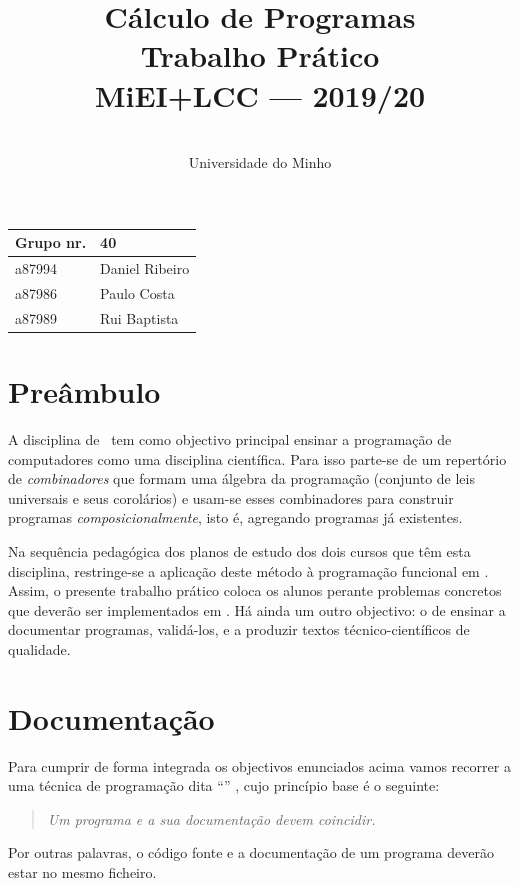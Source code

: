 \documentclass[a4paper]{article}
\title{
            Cálculo de Programas
\\
        Trabalho Prático
\\
        MiEI+LCC --- 2019/20
}
\author{
        \dium
\\
        Universidade do Minho
}
\date\mydate
\begin{document}
\maketitle

\begin{center}\large
\begin{tabular}{ll}
\textbf{Grupo} nr. & 40 
\\\hline
a87994 & Daniel Ribeiro 
\\
a87986 & Paulo Costa  
\\
a87989 & Rui Baptista
\end{tabular}
\end{center}

\section{Preâmbulo}

A disciplina de \CP\ tem como objectivo principal ensinar
a progra\-mação de computadores como uma disciplina científica. Para isso
parte-se de um repertório de \emph{combinadores} que formam uma álgebra da
programação (conjunto de leis universais e seus corolários) e usam-se esses
combinadores para construir programas \emph{composicionalmente}, isto é,
agregando programas já existentes.
  
Na sequência pedagógica dos planos de estudo dos dois cursos que têm
esta disciplina, restringe-se a aplicação deste método à programação
funcional em \Haskell. Assim, o presente trabalho prático coloca os
alunos perante problemas concretos que deverão ser implementados em
\Haskell.  Há ainda um outro objectivo: o de ensinar a documentar
programas, validá-los, e a produzir textos técnico-científicos de
qualidade.

\section{Documentação} Para cumprir de forma integrada os objectivos
enunciados acima vamos recorrer a uma técnica de programa\-ção dita
``'' \cite{Kn92}, cujo princípio base é o seguinte:
\begin{quote}\em Um programa e a sua documentação devem coincidir.
\end{quote} Por outras palavras, o código fonte e a documentação de um
programa deverão estar no mesmo ficheiro.
\end{document}
